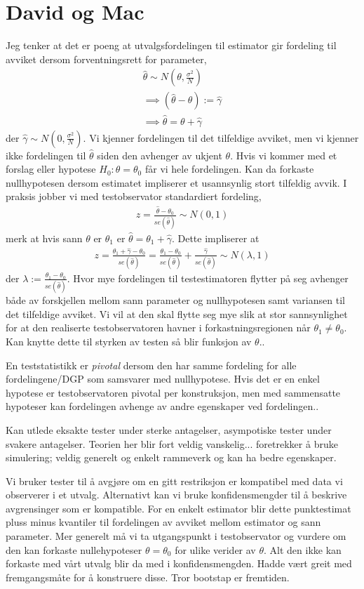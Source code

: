\section{David og Mac}
Jeg tenker at det er poeng at utvalgsfordelingen til estimator gir fordeling til avviket dersom forventningsrett for parameter,
\begin{align}
\hat{\theta}\sim N\left(\theta, \frac{\sigma^2}{N}\right) \\
\implies (\hat{\theta}-\theta):=\hat{\gamma}  \\
\implies \hat{\theta}=\theta + \hat{\gamma}
\end{align}
der $\hat{\gamma} \sim N\left(0, \frac{\sigma^2}{N}\right)$. Vi kjenner fordelingen til det tilfeldige avviket, men vi kjenner ikke fordelingen til $\hat{\theta}$ siden den avhenger av ukjent $\theta$. Hvis vi kommer med et forslag eller hypotese $H_0:\theta=\theta_0$ får vi hele fordelingen. Kan da forkaste nullhypotesen dersom estimatet impliserer et usannsynlig stort tilfeldig avvik. I praksis jobber vi med testobservator standardiert fordeling,
\begin{align}
z=\frac{\hat{\theta}-\theta_0}{se(\hat{\theta})} \sim N(0,1)
\end{align}
merk at hvis sann $\theta$ er $\theta_1$ er $\hat{\theta}=\theta_1 + \hat{\gamma}$. Dette impliserer at
\begin{align}
z = \frac{\theta_1+\hat{\gamma}-\theta_0}{se(\hat{\theta})}=\frac{\theta_1-\theta_0}{se(\hat{\theta})}+\frac{\hat{\gamma}}{se(\hat{\theta})}\sim N(\lambda,1)
\end{align}
der $\lambda :=\frac{\theta_1-\theta_0}{se(\hat{\theta})}$. Hvor mye fordelingen til testestimatoren flytter på seg avhenger både av forskjellen mellom sann parameter og nullhypotesen samt variansen til det tilfeldige avviket. Vi vil at den skal flytte seg mye slik at stor sannsynlighet for at den realiserte testobservatoren havner i forkastningsregionen når $\theta_1 \neq \theta_0$. Kan knytte dette til styrken av testen så blir funksjon av $\theta$..

En teststatistikk er \textit{pivotal} dersom den har samme fordeling for alle fordelingene/DGP som samsvarer med nullhypotese. Hvis det er en enkel hypotese er testobservatoren pivotal per konstruksjon, men med sammensatte hypoteser kan fordelingen avhenge av andre egenskaper ved fordelingen..

Kan utlede eksakte tester under sterke antagelser, asympotiske tester under svakere antagelser. Teorien her blir fort veldig vanskelig... foretrekker å bruke simulering; veldig generelt og enkelt rammeverk og kan ha bedre egenskaper.

Vi bruker tester til å avgjøre om en gitt restriksjon er kompatibel med data vi observerer i et utvalg. Alternativt kan vi bruke konfidensmengder til å beskrive avgrensinger som er kompatible. For en enkelt estimator blir dette punktestimat pluss minus kvantiler til fordelingen av avviket mellom estimator og sann parameter. Mer generelt må vi ta utgangspunkt i testobservator og vurdere om den kan forkaste nullehypoteser $\theta=\theta_0$ for ulike verider av $\theta$. Alt den ikke kan forkaste med vårt utvalg blir da med i konfidensmengden. Hadde vært greit med fremgangsmåte for å konstruere disse. Tror bootstap er fremtiden.
